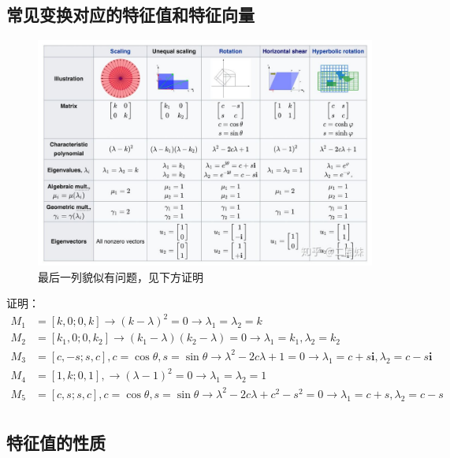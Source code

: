 \documentclass[12pt]{article}
\begin{document}
\subsection{常见变换对应的特征值和特征向量}
\begin{figure}[H]
    \centering
    \includegraphics[width=1.0\textwidth]{fig/EigenValueVectorsCommon.jpg}
    \caption*{最后一列貌似有问题，见下方证明}
\end{figure} 
\begin{framed}  
\small{
证明：
\begin{align*}
M_1 &= [k,0;0,k] \rightarrow (k-\lambda)^2 = 0 \rightarrow \lambda_1 = \lambda_2 = k \\
M_2 &= [k_1,0;0,k_2] \rightarrow (k_1 - \lambda)(k_2 - \lambda) = 0 \rightarrow \lambda_1 = k_1, \lambda_2 = k_2 \\
M_3 &= [c, -s; s, c], c = \cos\theta, s = \sin\theta \rightarrow  \lambda^2 - 2c\lambda + 1 = 0\rightarrow \lambda_1 = c + s\mathbf{i}, \lambda_2 = c - s\mathbf{i} \\
M_4 &= [1,k;0,1],  \rightarrow  (\lambda-1)^2 = 0 \rightarrow \lambda_1 = \lambda_2 = 1 \\
M_5 &= [c, s; s, c], c = \cos\theta, s = \sin\theta \rightarrow  \lambda^2 - 2c\lambda + c^2 - s^2 = 0\rightarrow \lambda_1 = c + s, \lambda_2 = c - s \\
\end{align*}
}
\end{framed}

\subsection{特征值的性质\cite{Eigen_Value_And_Eigen_Vector_Zhihu}}
\end{document}
